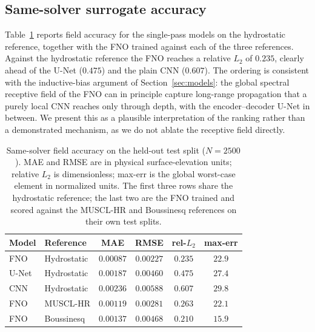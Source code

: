 \subsection{Same-solver surrogate accuracy}
\label{subsec:res-accuracy}
Table~\ref{tab:accuracy} reports field accuracy for the single-pass models on the hydrostatic reference, together with the FNO trained against each of the three references. Against the hydrostatic reference the FNO reaches a relative $L_2$ of $0.235$, clearly ahead of the U-Net ($0.475$) and the plain CNN ($0.607$). The ordering is consistent with the inductive-bias argument of Section~\ref{sec:models}: the global spectral receptive field of the FNO can in principle capture long-range propagation that a purely local CNN reaches only through depth, with the encoder--decoder U-Net in between. We present this as a plausible interpretation of the ranking rather than a demonstrated mechanism, as we do not ablate the receptive field directly.

\begin{table}[!htbp]
\centering
\caption{Same-solver field accuracy on the held-out test split ($N = 2500$). MAE and RMSE are in physical surface-elevation units; relative $L_2$ is dimensionless; max-err is the global worst-case element in normalized units. The first three rows share the hydrostatic reference; the last two are the FNO trained and scored against the MUSCL-HR and Boussinesq references on their own test splits.}
\label{tab:accuracy}
\begin{tabular}{llcccc}
    \toprule
    Model & Reference & MAE & RMSE & rel-$L_2$ & max-err \\
    \midrule
    FNO   & Hydrostatic & $0.00087$ & $0.00227$ & $\mathbf{0.235}$ & $22.9$ \\
    U-Net & Hydrostatic & $0.00187$ & $0.00460$ & $0.475$          & $27.4$ \\
    CNN   & Hydrostatic & $0.00236$ & $0.00588$ & $0.607$          & $29.8$ \\
    \midrule
    FNO   & MUSCL-HR    & $0.00119$ & $0.00281$ & $0.263$          & $22.1$ \\
    FNO   & Boussinesq  & $0.00137$ & $0.00468$ & $0.210$          & $15.9$ \\
    \bottomrule
\end{tabular}
\end{table}

